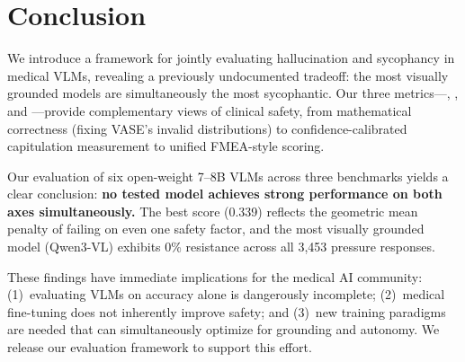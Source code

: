 \section{Conclusion}
\label{sec:conclusion}

We introduce a framework for jointly evaluating hallucination and sycophancy in medical VLMs, revealing a previously undocumented tradeoff: the most visually grounded models are simultaneously the most sycophantic. Our three metrics---\lvase{}, \ccs{}, and \csi{}---provide complementary views of clinical safety, from mathematical correctness (fixing VASE's invalid distributions) to confidence-calibrated capitulation measurement to unified FMEA-style scoring.

Our evaluation of six open-weight 7--8B VLMs across three benchmarks yields a clear conclusion: \textbf{no tested model achieves strong performance on both axes simultaneously.} The best \csi{} score (0.339) reflects the geometric mean penalty of failing on even one safety factor, and the most visually grounded model (Qwen3-VL) exhibits 0\% resistance across all 3,453 pressure responses.

These findings have immediate implications for the medical AI community: (1)~evaluating VLMs on accuracy alone is dangerously incomplete; (2)~medical fine-tuning does not inherently improve safety; and (3)~new training paradigms are needed that can simultaneously optimize for grounding and autonomy. We release our evaluation framework to support this effort.
